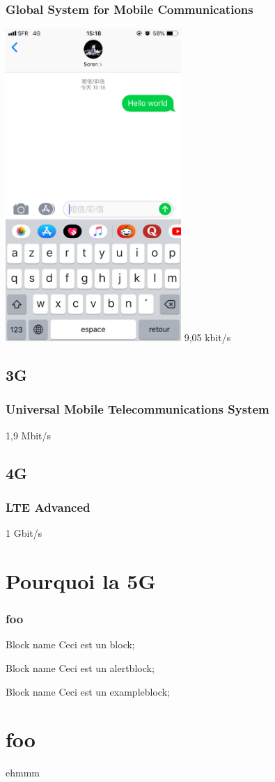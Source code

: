 \documentclass{beamer}
\begin{document}
    \begin{frame}
        \frametitle{Global System for Mobile Communications}
        \includegraphics[width=0.5\textwidth,height=0.9\textheight]{img/sms.jpg}
        9,05 kbit/s
    \end{frame}

    \subsection{3G}
    \begin{frame}
        \frametitle{Universal Mobile Telecommunications System}
        1,9 Mbit/s
    \end{frame}

    \subsection{4G}
    \begin{frame}
        \frametitle{LTE Advanced}
        1 Gbit/s
    \end{frame}

    \section{Pourquoi la 5G}
    \begin{frame}
        \frametitle{foo}
        \begin{block}{Block name}
            Ceci est un block;
        \end{block}
        \begin{alertblock}{Block name}
            Ceci est un alertblock;
        \end{alertblock}
        \begin{exampleblock}{Block name}
            Ceci est un exampleblock;
        \end{exampleblock}

    \end{frame}
    \section{foo}
    \begin{frame}
        ehmmm
    \end{frame}
\end{document}
